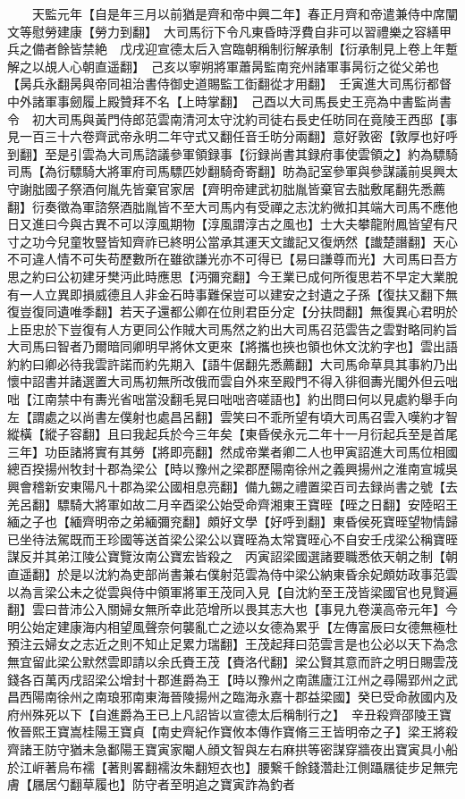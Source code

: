 　　天監元年【自是年三月以前猶是齊和帝中興二年】春正月齊和帝遣兼侍中席闡文等慰勞建康【勞力到翻】　大司馬衍下令凡東昏時浮費自非可以習禮樂之容繕甲兵之備者餘皆禁絶　戊戌迎宣德太后入宫臨朝稱制衍解承制【衍承制見上卷上年蹔解之以覘人心朝直遥翻】　己亥以寧朔將軍蕭昺監南兖州諸軍事昺衍之從父弟也【昺兵永翻昺與帝同祖治書侍御史道賜監工衘翻從才用翻】　壬寅進大司馬衍都督中外諸軍事劒履上殿贊拜不名【上時掌翻】　己酉以大司馬長史王亮為中書監尚書令　初大司馬與黃門侍郎范雲南清河太守沈約司徒右長史任昉同在竟陵王西邸【事見一百三十六卷齊武帝永明二年守式又翻任音壬昉分兩翻】意好敦密【敦厚也好呼到翻】至是引雲為大司馬諮議參軍領録事【衍録尚書其録府事使雲領之】約為驃騎司馬【為衍驃騎大將軍府司馬驃匹妙翻騎奇寄翻】昉為記室參軍與參謀議前吳興太守謝朏國子祭酒何胤先皆棄官家居【齊明帝建武初朏胤皆棄官去朏敷尾翻先悉薦翻】衍奏徵為軍諮祭酒朏胤皆不至大司馬内有受禪之志沈約微扣其端大司馬不應他日又進曰今與古異不可以淳風期物【淳風謂淳古之風也】士大夫攀龍附鳳皆望有尺寸之功今兒童牧豎皆知齊祚已終明公當承其運天文䜟記又復炳然【䜟楚譖翻】天心不可違人情不可失苟歷數所在雖欲謙光亦不可得已【易曰謙尊而光】大司馬曰吾方思之約曰公初建牙樊沔此時應思【沔彌兖翻】今王業已成何所復思若不早定大業脫有一人立異即損威德且人非金石時事難保豈可以建安之封遺之子孫【復扶又翻下無復豈復同遺唯季翻】若天子還都公卿在位則君臣分定【分扶問翻】無復異心君明於上臣忠於下豈復有人方更同公作賊大司馬然之約出大司馬召范雲告之雲對略同約旨大司馬曰智者乃爾暗同卿明早將休文更來【將攜也挾也領也休文沈約字也】雲出語約約曰卿必待我雲許諾而約先期入【語牛倨翻先悉薦翻】大司馬命草具其事約乃出懷中詔書并諸選置大司馬初無所改俄而雲自外來至殿門不得入徘徊夀光閣外但云咄咄【江南禁中有夀光省咄當没翻毛晃曰咄咄咨嗟語也】約出問曰何以見處約舉手向左【謂處之以尚書左僕射也處昌呂翻】雲笑曰不乖所望有頃大司馬召雲入嘆約才智縱橫【縱子容翻】且曰我起兵於今三年矣【東昏侯永元二年十一月衍起兵至是首尾三年】功臣諸將實有其勞【將即亮翻】然成帝業者卿二人也甲寅詔進大司馬位相國總百揆揚州牧封十郡為梁公【時以豫州之梁郡歷陽南徐州之義興揚州之淮南宣城吳興會稽新安東陽凡十郡為梁公國相息亮翻】備九錫之禮置梁百司去録尚書之號【去羌呂翻】驃騎大將軍如故二月辛酉梁公始受命齊湘東王寶晊【晊之日翻】安陸昭王緬之子也【緬齊明帝之弟緬彌兖翻】頗好文學【好呼到翻】東昏侯死寶晊望物情歸已坐待法駕既而王珍國等送首梁公梁公以寶晊為太常寶晊心不自安壬戌梁公稱寶晊謀反并其弟江陵公寶覽汝南公寶宏皆殺之　丙寅詔梁國選諸要職悉依天朝之制【朝直遥翻】於是以沈約為吏部尚書兼右僕射范雲為侍中梁公納東昏余妃頗妨政事范雲以為言梁公未之從雲與侍中領軍將軍王茂同入見【自沈約至王茂皆梁國官也見賢遍翻】雲曰昔沛公入關婦女無所幸此范增所以畏其志大也【事見九卷漢高帝元年】今明公始定建康海内相望風聲奈何襲亂亡之迹以女德為累乎【左傳富辰曰女德無極杜預注云婦女之志近之則不知止足累力瑞翻】王茂起拜曰范雲言是也公必以天下為念無宜留此梁公默然雲即請以余氏賚王茂【賚洛代翻】梁公賢其意而許之明日賜雲茂錢各百萬丙戌詔梁公增封十郡進爵為王【時以豫州之南譙廬江江州之尋陽郢州之武昌西陽南徐州之南琅邪南東海晉陵揚州之臨海永嘉十郡益梁國】癸巳受命赦國内及府州殊死以下【自進爵為王已上凡詔皆以宣德太后稱制行之】　辛丑殺齊邵陵王寶攸晉熙王寶嵩桂陽王寶貞【南史齊紀作寶攸本傳作寶脩三王皆明帝之子】梁王將殺齊諸王防守猶未急鄱陽王寶寅家閹人顔文智與左右麻拱等密謀穿牆夜出寶寅具小船於江㟁著烏布襦【著則畧翻襦汝朱翻短衣也】腰繋千餘錢濳赴江側躡屩徒步足無完膚【屩居勺翻草履也】防守者至明追之寶寅詐為釣者